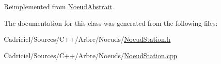Reimplemented from \hyperlink{group__inf2990_gadc6ebe69894dbb682fdd0ecb1b6c11e9}{Noeud\-Abstrait}.



The documentation for this class was generated from the following files\-:\begin{DoxyCompactItemize}
\item 
Cadriciel/\-Sources/\-C++/\-Arbre/\-Noeuds/\hyperlink{_noeud_station_8h}{Noeud\-Station.\-h}\item 
Cadriciel/\-Sources/\-C++/\-Arbre/\-Noeuds/\hyperlink{_noeud_station_8cpp}{Noeud\-Station.\-cpp}\end{DoxyCompactItemize}
